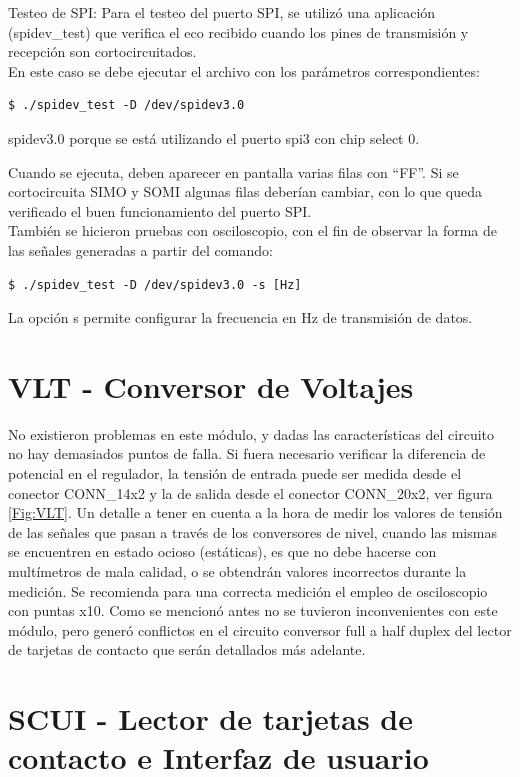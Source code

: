 \bigskip
Testeo de SPI: Para el testeo del puerto SPI, se utilizó una aplicación (spidev\_test) que verifica el eco recibido cuando los pines de transmisión y recepción son cortocircuitados.\\
En este caso se debe ejecutar el archivo con los parámetros correspondientes:

\begin{verbatim}
$ ./spidev_test -D /dev/spidev3.0
\end{verbatim}

spidev3.0 porque se está utilizando el puerto spi3 con chip select 0.

\bigskip
Cuando se ejecuta, deben aparecer en pantalla varias filas con “FF”. Si
se cortocircuita SIMO y SOMI algunas filas deberían cambiar, con lo que queda
verificado el buen funcionamiento del puerto SPI. \\
También se hicieron pruebas con osciloscopio, con el fin de observar la forma de las señales generadas a partir del comando:

\begin{verbatim}
$ ./spidev_test -D /dev/spidev3.0 -s [Hz]
\end{verbatim}

La opción s permite configurar la frecuencia en Hz de transmisión de datos.


\section{VLT - Conversor de Voltajes}
No existieron problemas en este módulo, y dadas las características del circuito
no hay demasiados puntos de falla. Si fuera necesario verificar la diferencia de
potencial en el regulador, la tensión de entrada puede ser medida desde
el conector CONN\_14x2 y la de salida desde el conector CONN\_20x2, ver figura \ref{Fig:VLT}.
Un detalle a tener en cuenta a la hora de medir los valores de tensión de las
señales que pasan a través de los conversores de nivel, cuando las mismas se 
encuentren en estado ocioso (estáticas), es que no debe hacerse con multímetros 
de mala calidad, o se obtendrán valores incorrectos durante la medición. Se 
recomienda para una correcta medición el empleo de osciloscopio con puntas x10. 
Como se mencionó antes no se tuvieron inconvenientes con este módulo, pero generó 
conflictos en el circuito conversor full a half duplex del lector de tarjetas de 
contacto que serán detallados más adelante.


\section{SCUI - Lector de tarjetas de contacto e Interfaz de usuario}


